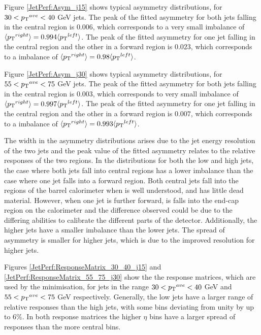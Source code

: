 Figure \ref{JetPerf:Asym_j15} shows typical asymmetry distributions, for $30<\mbox{$\mbox{$p_{\rm T}$}{}^{ave}$}{}<40$ GeV jets.
The peak of the fitted asymmetry for both jets falling in the central region is $0.006$, which corresponds to a very small \pt{} imbalance of $\mbox{$\langle \mbox{$p_{\rm T}$}{}^{right} \rangle$}= 0.994 \mbox{$\langle \mbox{$p_{\rm T}$}{}^{left} \rangle$}$.
The peak of the fitted asymmetry for one jet falling in the central region and the other in a forward region is $0.023$, which corresponds to a \pt{} imbalance of $\mbox{$\langle \mbox{$p_{\rm T}$}{}^{right} \rangle$}= 0.98 \mbox{$\langle \mbox{$p_{\rm T}$}{}^{left} \rangle$}$.

Figure \ref{JetPerf:Asym_j30} shows typical asymmetry distributions, for $55<\mbox{$\mbox{$p_{\rm T}$}{}^{ave}$}{}<75$ GeV jets.
The peak of the fitted asymmetry for both jets falling in the central region is $0.003$, which corresponds to very small \pt{} imbalance of $\mbox{$\langle \mbox{$p_{\rm T}$}{}^{right} \rangle$}= 0.997 \mbox{$\langle \mbox{$p_{\rm T}$}{}^{left} \rangle$}$. 
The peak of the fitted asymmetry for one jet falling in the central region and the other in a forward region is $0.007$, which corresponds to a \pt{} imbalance of $\mbox{$\langle \mbox{$p_{\rm T}$}{}^{right} \rangle$}= 0.993 \mbox{$\langle \mbox{$p_{\rm T}$}{}^{left} \rangle$}$.

The width in the asymmetry distributions arises due to the jet energy resolution of the two jets and the peak value of the fitted asymmetry relates to the relative responses of the two regions.
In the distributions for both the low and high \ptave{} jets, the case where both jets fall into central regions has a lower \pt{} imbalance than the case where one jet falls into a forward region.  
Both central jets fall into the regions of the barrel calorimeter when is well understood, and has little dead material.
However, when one jet is further forward, is falls into the end-cap region on the calorimeter and the difference observed could be due to the differing abilities to calibrate the different parts of the detector. 
Additionally, the higher \ptave{} jets have a smaller \pt{} imbalance than the lower \ptave{} jets.
The spread of asymmetry is smaller for higher \ptave{} jets, which is due to the improved resolution for higher \pt{} jets.


Figures \ref{JetPerf:ResponseMatrix_30_40_j15} and \ref{JetPerf:ResponseMatrix_55_75_j30} show the the response matrices, which are used by the minimisation, for jets in the range $30<\mbox{$\mbox{$p_{\rm T}$}{}^{ave}$}{}<40$ GeV and $55<\mbox{$\mbox{$p_{\rm T}$}{}^{ave}$}{}<75$ GeV respectively.
Generally, the low \ptave{} jets have a larger range of relative responses than the high \ptave{} jets, with some bins deviating from unity by up to $6\%$.
In both response matrices the higher $\eta$ bins have a larger spread of responses than the more central bins.


